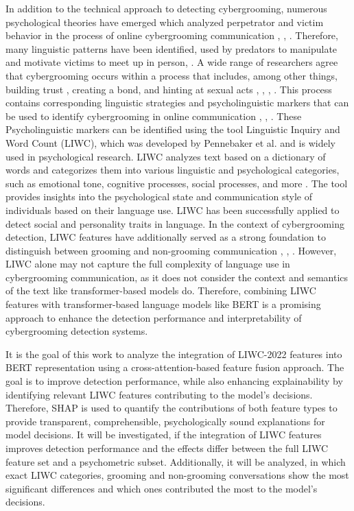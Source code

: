 In addition to the technical approach to detecting cybergrooming, numerous psychological theories have emerged which analyzed perpetrator and victim behavior in the process of online cybergrooming communication \cite{black2015linguistic}, \cite{lorenzo2016understanding}, \cite{oconnell2003typology}. Therefore, many linguistic patterns have been identified, used by predators to manipulate and motivate victims to meet up in person\cite{chiangandgrant2017online}, \cite{lorenzudus2017cause}. A wide range of researchers agree that cybergrooming occurs within a process that includes, among other things, building trust , creating a bond, and hinting at sexual acts \cite{oconnell2003typology}, \cite{lorenzudus2017cause}, \cite{williamsmodel}, \cite{chiangandgrant2017online} . This process contains corresponding linguistic strategies and psycholinguistic markers that can be used to identify cybergrooming in online communication \cite{black2015linguistic}, \cite{guo2023text}, \cite{broome2020psycholinguistic}. These Psycholinguistic markers can be identified using the tool Linguistic Inquiry and Word Count (LIWC), which was developed by Pennebaker et al. \cite{pennebaker2022liwc} and is widely used in psychological research. LIWC analyzes text based on a dictionary of words and categorizes them into various linguistic and psychological categories, such as emotional tone, cognitive processes, social processes, and more \cite{pennebaker2022liwc}. The tool provides insights into the psychological state and communication style of individuals based on their language use. LIWC has been successfully applied to detect social and personality traits in language\cite{tausczik2010psychological}. In the context of cybergrooming detection, LIWC features have additionally served as a strong foundation to distinguish between grooming and non-grooming communication \cite{broome2020psycholinguistic}, \cite{guo2023text}, \cite{gupta2012characterizingpedophileconversationsinternet}. However, LIWC alone may not capture the full complexity of language use in cybergrooming communication, as it does not consider the context and semantics of the text like transformer-based models do. Therefore, combining LIWC features with transformer-based language models like BERT is a promising approach to enhance the detection performance and interpretability of cybergrooming detection systems.

It is the goal of this work to analyze the integration of LIWC-2022 features into BERT representation using a cross-attention-based feature fusion approach. The goal is to improve detection performance, while also enhancing explainability by identifying relevant LIWC features contributing to the model's decisions. Therefore, SHAP \cite{lundberg2017shap} is used to quantify the contributions of both feature types to provide transparent, comprehensible, psychologically sound explanations for model decisions. It will be investigated, if the integration of LIWC features improves detection performance and the effects differ between the full LIWC feature set and a psychometric subset. Additionally, it will be analyzed, in which exact LIWC categories, grooming and non-grooming conversations show the most significant differences and which ones contributed the most to the model's decisions.

